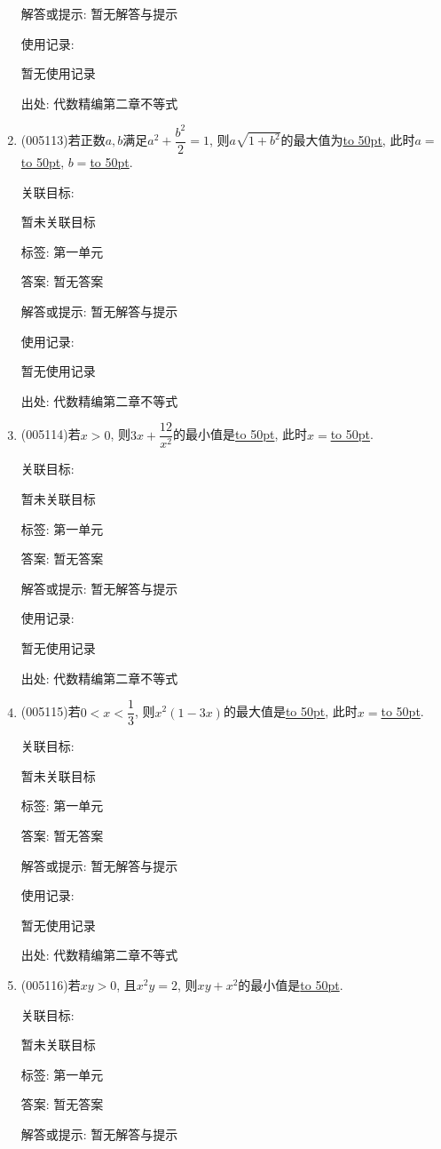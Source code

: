 \documentclass[10pt,a4paper]{article}
\newcommand{\blank}[1]{\underline{\hbox to #1pt{}}}
\begin{document}
\begin{enumerate}[1.]
解答或提示: 暂无解答与提示

使用记录:

暂无使用记录


出处: 代数精编第二章不等式
\item { (005113)}若正数$a,b$满足$a^2+\dfrac{b^2}2=1$, 则$a\sqrt{1+b^2}$的最大值为\blank{50}, 此时$a=$\blank{50}, $b=$\blank{50}.


关联目标:

暂未关联目标



标签: 第一单元

答案: 暂无答案

解答或提示: 暂无解答与提示

使用记录:

暂无使用记录


出处: 代数精编第二章不等式
\item { (005114)}若$x>0$, 则$3x+\dfrac{12}{x^2}$的最小值是\blank{50}, 此时$x=$\blank{50}.


关联目标:

暂未关联目标



标签: 第一单元

答案: 暂无答案

解答或提示: 暂无解答与提示

使用记录:

暂无使用记录


出处: 代数精编第二章不等式
\item { (005115)}若$0<x<\dfrac 13$, 则$x^2(1-3x)$的最大值是\blank{50}, 此时$x=$\blank{50}.


关联目标:

暂未关联目标



标签: 第一单元

答案: 暂无答案

解答或提示: 暂无解答与提示

使用记录:

暂无使用记录


出处: 代数精编第二章不等式
\item { (005116)}若$xy>0$, 且$x^2y=2$, 则$xy+x^2$的最小值是\blank{50}.


关联目标:

暂未关联目标



标签: 第一单元

答案: 暂无答案

解答或提示: 暂无解答与提示


\end{enumerate}
\end{document}
